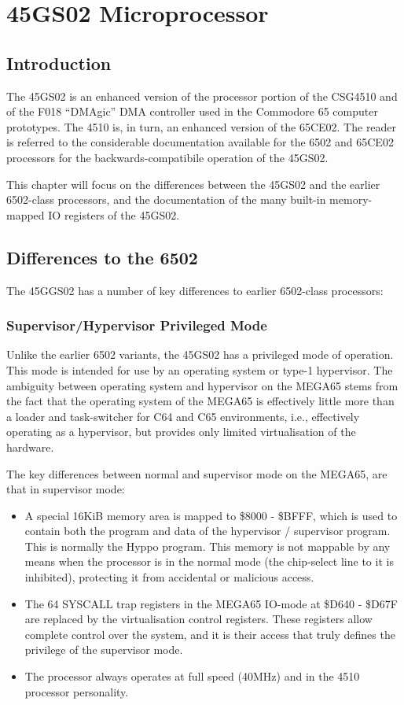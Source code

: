 \chapter{45GS02 Microprocessor}
\label{cha:cpu}
\label{cha:45gs02}
\section{Introduction}

The 45GS02 is an enhanced version of the processor portion of the CSG4510
and of the F018 ``DMAgic'' DMA controller used in the Commodore 65 computer prototypes.  The 4510 is, in turn,
an enhanced version of the 65CE02.  
The reader is referred to
the considerable documentation available for the 6502 and 65CE02 processors
for the backwards-compatibile operation of the 45GS02.

This chapter will
focus on the differences between the 45GS02 and the earlier 6502-class
processors, and the documentation of the many built-in memory-mapped IO
registers of the 45GS02.

\section{Differences to the 6502}

The 45GGS02 has a number of key differences to earlier 6502-class processors:

\subsection{Supervisor/Hypervisor Privileged Mode}

Unlike the earlier 6502 variants, the 45GS02 has a privileged mode of operation.
This mode is intended for use by an operating system or type-1 hypervisor.  The ambiguity between
operating system and hypervisor on the MEGA65 stems from the fact that the operating
system of the MEGA65 is effectively little more than a loader and task-switcher for C64 and C65
environments, i.e., effectively operating as a hypervisor, but provides only limited virtualisation
of the hardware.

The key differences between normal and supervisor mode on the MEGA65, are that in
supervisor mode:

\begin{itemize}
\item A special 16KiB memory area is mapped to \$8000 - \$BFFF, which is used to contain both
  the program and data of the hypervisor / supervisor program.  This is normally the Hyppo program.
  This memory is not mappable by any means when the processor is in the normal mode (the chip-select
  line to it is inhibited), protecting it from accidental or malicious access.
\item The 64 SYSCALL trap registers in the MEGA65 IO-mode at \$D640 - \$D67F are replaced by the
  virtualisation control registers.  These registers allow complete control over the system, and
  it is their access that truly defines the privilege of the supervisor mode.
  \item The processor always operates at full speed (40MHz) and in the 4510 processor personality.
\end{itemize}

